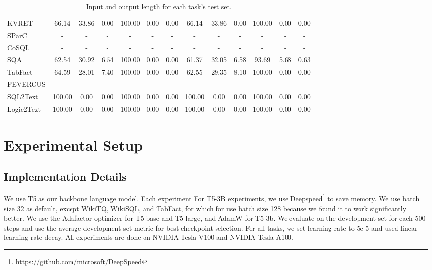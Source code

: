 \documentclass[11pt]{article}
\begin{document}
\begin{table*}[ht]
\begin{adjustbox}{width=\textwidth}
\begin{tabular}{@{}lcccccccccccc@{}}
    KVRET  & 66.14 & 33.86 & 0.00 & 100.00 & 0.00 & 0.00 & 66.14 & 33.86 & 0.00 & 100.00 & 0.00 & 0.00 \\
    SParC & - & - & - & - & - & - & - & - & - & - & - & -  \\
    CoSQL  & - & - & - & - & - & - & - & - & - & - & - & - \\
    SQA & 62.54 & 30.92 & 6.54 & 100.00 & 0.00 & 0.00 & 61.37 & 32.05 & 6.58 & 93.69 & 5.68 & 0.63 \\
    TabFact  & 64.59 & 28.01 & 7.40 & 100.00 & 0.00 & 0.00 & 62.55 & 29.35 & 8.10 & 100.00 & 0.00 & 0.00\\
    FEVEROUS  & - & - & - & - & - & - & - & - & - & - & - & - \\
    SQL2Text& 100.00 & 0.00 & 0.00 & 100.00 & 0.00 & 0.00 & 100.00 & 0.00 & 0.00 & 100.00 & 0.00 & 0.00 \\
    Logic2Text & 100.00 & 0.00 & 0.00 & 100.00 & 0.00 & 0.00 & 100.00 & 0.00 & 0.00 & 100.00 & 0.00 & 0.00 \\
    \bottomrule
    \end{tabular}
    \end{adjustbox}
	\caption{Input and output length for each task's test set.}
	\label{tab:length_distribution_test}
\end{table*} 
\section{Experimental Setup}
\label{app:experimental-setup}

\subsection{Implementation Details}
\label{subapp:implementation-details}
We use T5 \cite{2020t5} as our backbone language model. Each experiment For T5-3B experiments, we use Deepspeed\footnote{\url{https://github.com/microsoft/DeepSpeed}} to save memory. We use batch size 32 as default, except WikiTQ, WikiSQL, and TabFact, for which for use batch size 128 because we found it to work significantly better. We use the Adafactor optimizer for T5-base and T5-large, and AdamW for T5-3b. We evaluate on the development set for each 500 steps and use the average development set metric for best checkpoint selection. For all tasks, we set learning rate to 5e-5 and used linear learning rate decay. All experiments are done on NVIDIA Tesla V100 and NVIDIA Tesla A100. 
\end{document}
